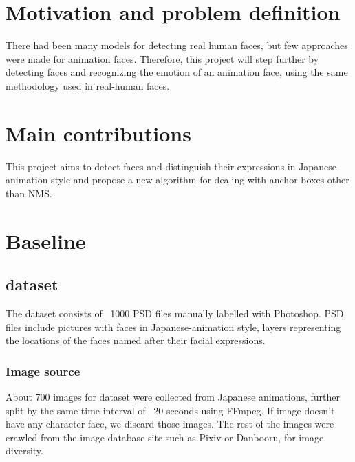 \documentclass{article}
\begin{document}


%
%

\section{Motivation and problem definition}
There had been many models for detecting real human faces, but few approaches
were made for animation faces. Therefore, this project will step further by
detecting faces and recognizing the emotion of an animation face, using the same
methodology used in real-human faces.

\section{Main contributions}
This project aims to detect faces and distinguish their expressions in
Japanese-animation style and propose a new algorithm for dealing with anchor
boxes other than NMS.

\section{Baseline}
\subsection{dataset}
The dataset consists of ~1000 PSD files manually labelled with Photoshop. PSD
files include pictures with faces in Japanese-animation style, layers
representing the locations of the faces named after their facial expressions.

\subsubsection{Image source}
About 700 images for dataset were collected from Japanese animations, further
split by the same time interval of ~20 seconds using FFmpeg. If image doesn’t
have any character face, we discard those images. The rest of the images were
crawled from the image database site such as Pixiv or Danbooru, for image
diversity.
\end{document}
